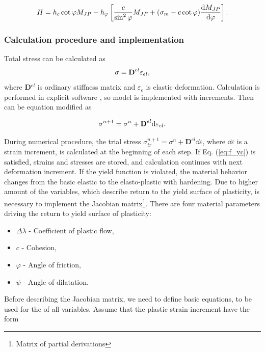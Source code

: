 \begin{equation}\label{eq:H_final}
	H = h_c \cot\varphi M_{JP} - h_\varphi \left[ \dfrac{c}{\sin^2 \varphi} M_{JP} + (\sigma_m - c \cot \varphi) \dv{M_{JP}}{\varphi} \right].
\end{equation}


\subsubsection{Calculation procedure and implementation}\label{sec:drucker-prager_count}
\indent
Total stress can be calculated as 
\begin{equation}\label{eq:f_sigma}
\sigma = \text{\textbf{D}}^{el} \varepsilon_{el},
\end{equation}
where \textbf{D}$^{el}$ is ordinary stiffness matrix and $\varepsilon_e$ is elastic deformation. Calculation is performed in explicit software \cite{mars}, so model is implemented with increments. Then can be equation modified as

\begin{equation}\label{eq:f_sigma1}
	\sigma^{n+1} = \sigma^n+ \text{\textbf{D}}^{el} \mathrm{d} \varepsilon_{el}.
\end{equation}

During numerical procedure, the trial stress $ \sigma_{tr}^{n+1} = \sigma^n + \textbf{D}^{el}\dd\varepsilon$, where $\dd\varepsilon$ is a strain increment, is calculated at the beginning of each step. If Eq. (\ref{eq:f_yc}) is satisfied, strains and stresses are stored, and calculation continues with next deformation increment. If the yield function is violated, the material behavior changes from the basic elastic to the elasto-plastic with hardening. Due to higher amount of the variables, which describe return to the yield surface of plasticity, is necessary to implement the Jacobian matrix\footnote{Matrix of partial derivations}. There are four material parameters driving the return to yield surface of plasticity:

\begin{itemize}
	\item $\Delta\lambda$ - Coefficient of plastic flow,
	\item $c$ - Cohesion,
	\item  $\varphi$ - Angle of friction,
	\item $\psi$ - Angle of dilatation.
\end{itemize}

Before describing the Jacobian matrix, we need to define basic equations, to be used for the of all variables. Assume that the plastic strain increment have the form 

